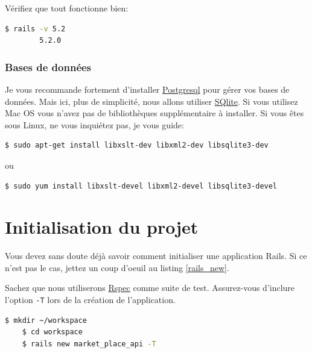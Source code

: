 \documentclass[]{report}
\begin{document}
        Vérifiez que tout fonctionne bien:

        \begin{scriptsize}
        \begin{lstlisting}[language=bash]
        $ rails -v 5.2
        5.2.0
        \end{lstlisting}
        \end{scriptsize}

      \subsubsection{Bases de données}

        Je vous recommande fortement d'installer \href{http://www.postgresql.org/}{Postgresql} pour gérer vos bases de données. Mais ici, plus de simplicité, nous allons utiliser \href{http://www.sqlite.org/}{SQlite}. Si vous utilisez Mac OS vous n'avez pas de bibliothèques supplémentaire à installer. Si vous êtes sous Linux, ne vous inquiétez pas, je vous guide:

        \begin{scriptsize}
        \begin{lstlisting}[language=bash]
        $ sudo apt-get install libxslt-dev libxml2-dev libsqlite3-dev
        \end{lstlisting}
        \end{scriptsize}

        ou

        \begin{scriptsize}
        \begin{lstlisting}[language=bash]
        $ sudo yum install libxslt-devel libxml2-devel libsqlite3-devel
        \end{lstlisting}
        \end{scriptsize}

  \section{Initialisation du projet}

    Vous devez sans doute déjà savoir comment initialiser une application Rails. Si ce n'est pas le cas, jettez un coup d'oeuil au listing \ref{rails_new}.

    Sachez que nous utiliserons \href{http://rspec.info/}{Rspec} comme suite de test. Assurez-vous d'inclure l'option \verb|-T| lors de la création de l'application.

    \begin{scriptsize}
    \begin{lstlisting}[language=bash, caption={Initialisation du projet avec 'rails new'.}, label={rails_new}]
    $ mkdir ~/workspace
    $ cd workspace
    $ rails new market_place_api -T
    \end{lstlisting}
    \end{scriptsize}
\end{document}
